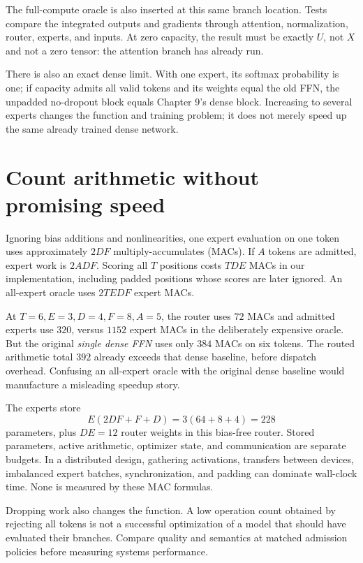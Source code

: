 The full-compute oracle is also inserted at this same branch location. Tests
compare the integrated outputs and gradients through attention, normalization,
router, experts, and inputs. At zero capacity, the result must be exactly
$U$, not $X$ and not a zero tensor: the attention branch has already run.

There is also an exact dense limit. With one expert, its softmax probability
is one; if capacity admits all valid tokens and its weights equal the old FFN,
the unpadded no-dropout block equals Chapter 9's dense block. Increasing to
several experts changes the function and training problem; it does not merely
speed up the same already trained dense network.

\section{Count arithmetic without promising speed}
Ignoring bias additions and nonlinearities, one expert evaluation on one token
uses approximately $2DF$ multiply-accumulates (MACs). If $A$ tokens are admitted,
expert work is $2ADF$. Scoring all $T$ positions costs $TDE$ MACs in our
implementation, including padded positions whose scores are later ignored.
An all-expert oracle uses $2TEDF$ expert MACs.

At $T=6,E=3,D=4,F=8,A=5$, the router uses $72$ MACs and admitted experts
use $320$, versus $1152$ expert MACs in the deliberately expensive oracle.
But the original \emph{single dense FFN} uses only $384$ MACs on six tokens.
The routed arithmetic total $392$ already exceeds that dense baseline, before
dispatch overhead. Confusing an all-expert oracle with the original dense
baseline would manufacture a misleading speedup story.

The experts store
\begin{equation}
E(2DF+F+D)=3(64+8+4)=228
\end{equation}
parameters, plus $DE=12$ router weights in this bias-free router. Stored
parameters, active arithmetic, optimizer state, and communication are separate
budgets. In a distributed design, gathering activations, transfers between
devices, imbalanced expert batches, synchronization, and padding can dominate
wall-clock time. None is measured by these MAC formulas.

Dropping work also changes the function. A low operation count obtained by
rejecting all tokens is not a successful optimization of a model that should
have evaluated their branches. Compare quality and semantics at matched
admission policies before measuring systems performance.

